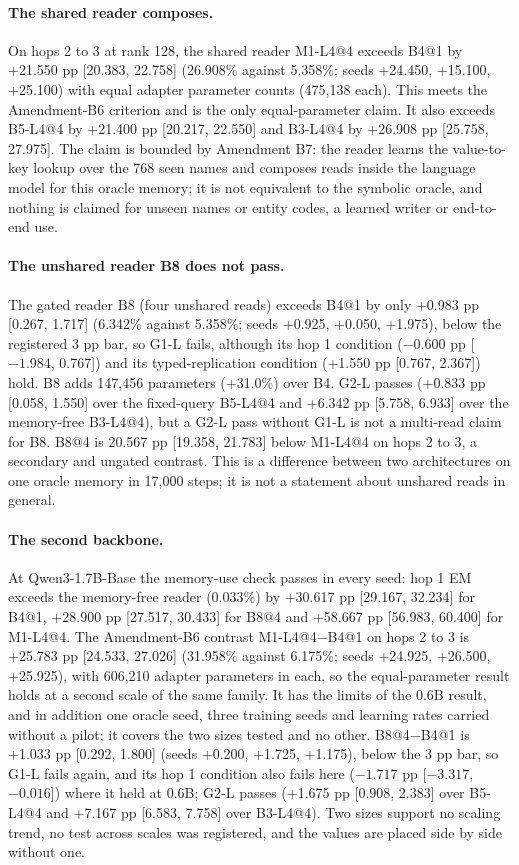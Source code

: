\paragraph{The shared reader composes.}
On hops 2 to 3 at rank 128, the shared reader M1-L4@4 exceeds B4@1 by +21.550 pp [20.383, 22.758] (26.908\% against 5.358\%; seeds +24.450, +15.100, +25.100) with equal adapter parameter counts (475,138 each).  %
This meets the Amendment-B6 criterion and is the only equal-parameter claim.
It also exceeds B5-L4@4 by +21.400 pp [20.217, 22.550] and B3-L4@4 by +26.908 pp [25.758, 27.975].  %
The claim is bounded by Amendment B7: the reader learns the value-to-key lookup over the 768 seen names and composes reads inside the language model for this oracle memory; it is not equivalent to the symbolic oracle, and nothing is claimed for unseen names or entity codes, a learned writer or end-to-end use.  %
\paragraph{The unshared reader B8 does not pass.}
The gated reader B8 (four unshared reads) exceeds B4@1 by only +0.983 pp [0.267, 1.717] (6.342\% against 5.358\%; seeds +0.925, +0.050, +1.975), below the registered 3 pp bar, so G1-L fails, although its hop 1 condition ($-0.600$ pp [$-1.984$, 0.767]) and its typed-replication condition (+1.550 pp [0.767, 2.367]) hold.  %
B8 adds 147,456 parameters (+31.0\%) over B4.
G2-L passes (+0.833 pp [0.058, 1.550] over the fixed-query B5-L4@4 and +6.342 pp [5.758, 6.933] over the memory-free B3-L4@4), but a G2-L pass without G1-L is not a multi-read claim for B8.  %
B8@4 is 20.567 pp [19.358, 21.783] below M1-L4@4 on hops 2 to 3, a secondary and ungated contrast.  %
This is a difference between two architectures on one oracle memory in 17,000 steps; it is not a statement about unshared reads in general.  %

\paragraph{The second backbone.}
At Qwen3-1.7B-Base the memory-use check passes in every seed: hop 1 EM exceeds the memory-free reader (0.033\%) by +30.617 pp [29.167, 32.234] for B4@1, +28.900 pp [27.517, 30.433] for B8@4 and +58.667 pp [56.983, 60.400] for M1-L4@4.  %
The Amendment-B6 contrast M1-L4@4$-$B4@1 on hops 2 to 3 is +25.783 pp [24.533, 27.026] (31.958\% against 6.175\%; seeds +24.925, +26.500, +25.925), with 606,210 adapter parameters in each, so the equal-parameter result holds at a second scale of the same family.  %
It has the limits of the 0.6B result, and in addition one oracle seed, three training seeds and learning rates carried without a pilot; it covers the two sizes tested and no other.  %
B8@4$-$B4@1 is +1.033 pp [0.292, 1.800] (seeds +0.200, +1.725, +1.175), below the 3 pp bar, so G1-L fails again, and its hop 1 condition also fails here ($-1.717$ pp [$-3.317$, $-0.016$]) where it held at 0.6B; G2-L passes (+1.675 pp [0.908, 2.383] over B5-L4@4 and +7.167 pp [6.583, 7.758] over B3-L4@4).  %
Two sizes support no scaling trend, no test across scales was registered, and the values are placed side by side without one.  %

